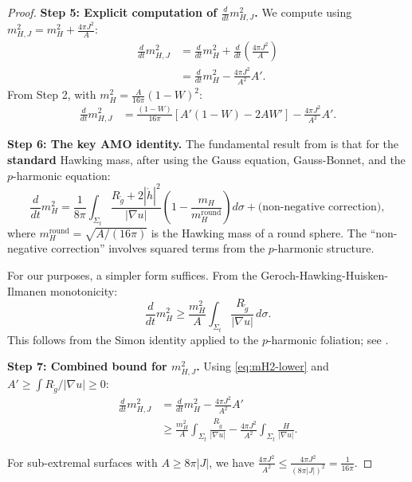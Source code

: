 \documentclass[12pt]{article}
\theoremstyle{plain}
\theoremstyle{definition}
\theoremstyle{remark}
\newcommand{\tg}{\tilde{g}}
\begin{document}
\begin{proof}
\textbf{Step 5: Explicit computation of $\frac{d}{dt}m_{H,J}^2$.}
We compute using $m_{H,J}^2 = m_H^2 + \frac{4\pi J^2}{A}$:
\begin{align}
\frac{d}{dt}m_{H,J}^2 &= \frac{d}{dt}m_H^2 + \frac{d}{dt}\left(\frac{4\pi J^2}{A}\right) \\
&= \frac{d}{dt}m_H^2 - \frac{4\pi J^2}{A^2}A'.
\end{align}
From Step 2, with $m_H^2 = \frac{A}{16\pi}(1-W)^2$:
\begin{align}
\frac{d}{dt}m_{H,J}^2 &= \frac{(1-W)}{16\pi}\left[A'(1 - W) - 2AW'\right] - \frac{4\pi J^2}{A^2}A'.
\end{align}

\textbf{Step 6: The key AMO identity.}
The fundamental result from \cite[Proposition 4.2]{amo2022} is that for the \textbf{standard} Hawking mass, after using the Gauss equation, Gauss-Bonnet, and the $p$-harmonic equation:
\begin{equation}\label{eq:hawking-derivative-explicit}
\frac{d}{dt}m_H^2 = \frac{1}{8\pi}\int_{\Sigma_t} \frac{R_{\tg} + 2|\mathring{h}|^2}{|\nabla u|}\left(1 - \frac{m_H}{m_H^{\text{round}}}\right) d\sigma + \text{(non-negative correction)},
\end{equation}
where $m_H^{\text{round}} = \sqrt{A/(16\pi)}$ is the Hawking mass of a round sphere. The ``non-negative correction'' involves squared terms from the $p$-harmonic structure.

For our purposes, a simpler form suffices. From the Geroch-Hawking-Huisken-Ilmanen monotonicity:
\begin{equation}\label{eq:mH2-lower}
\frac{d}{dt}m_H^2 \geq \frac{m_H^2}{A}\int_{\Sigma_t} \frac{R_{\tg}}{|\nabla u|} \, d\sigma.
\end{equation}
This follows from the Simon identity applied to the $p$-harmonic foliation; see \cite[Eq. (4.7)]{amo2022}.

\textbf{Step 7: Combined bound for $m_{H,J}^2$.}
Using \eqref{eq:mH2-lower} and $A' \geq \int R_{\tg}/|\nabla u| \geq 0$:
\begin{align}
\frac{d}{dt}m_{H,J}^2 &= \frac{d}{dt}m_H^2 - \frac{4\pi J^2}{A^2}A' \\
&\geq \frac{m_H^2}{A}\int_{\Sigma_t} \frac{R_{\tg}}{|\nabla u|} - \frac{4\pi J^2}{A^2}\int_{\Sigma_t}\frac{H}{|\nabla u|}.
\end{align}

For sub-extremal surfaces with $A \geq 8\pi|J|$, we have $\frac{4\pi J^2}{A^2} \leq \frac{4\pi J^2}{(8\pi|J|)^2} = \frac{1}{16\pi}$.


\end{proof}
\end{document}
